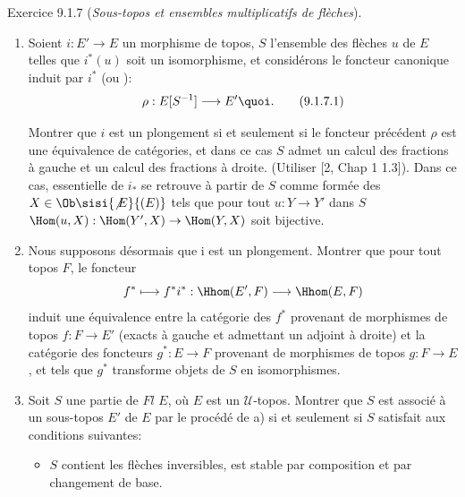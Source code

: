 \documentclass[10pt]{../fichiers-configuration-latex/smfart}
\begin{document}
\begin{enonce*}[remark]{Exercice 9.1.7}
(\emph{Sous-topos et ensembles multiplicatifs de flèches}).

\begin{enumerate}
\renewcommand{\theenumi}{\alph{enumi}}
\renewcommand{\labelenumi}{\theenumi)}
\item Soient $i:E'\rightarrow E$ un morphisme de topos, $S$ l'ensemble des
flèches $u$ de $E$ telles que $i^{\ast}(u)$ soit un isomorphisme, et
considérons le foncteur canonique induit par $i^{\ast}$ (\cf [2,
Chap I] ou ):
\begin{equation*}
\rho:E[S^{-1}]\longrightarrow E'{\quoi}.\tag{9.1.7.1}
\end{equation*}

Montrer que $i$ est un plongement si et seulement si le foncteur
précédent $\rho$ est une équivalence de catégories, et dans ce cas
$S$ admet un calcul des fractions à gauche et un calcul des
fractions à droite. (Utiliser [2, Chap 1 1.3]). Dans ce cas, 
essentielle de $i_{\ast}$ se retrouve à partir de $S$ comme formée
des $X\in \Ob \sisi{\not{E}}{(E)}$ tels que pour tout\pageoriginale
$u:Y\rightarrow Y'$ dans $S$ $\Hom(u,X):\Hom(Y',X)\rightarrow
\Hom(Y,X)$ soit bijective.

\item Nous supposons désormais que i est un plongement. Montrer que
pour tout topos $F$, le foncteur
$$
f^{\ast}\longmapsto f^{\ast}i^{\ast}:\Hhom(E',F)\longrightarrow
\Hhom(E,F)
$$
induit une équivalence entre la catégorie des $f^{\ast}$ provenant
de morphismes de topos $f:F\rightarrow E'$ (\ie exacts à gauche et
admettant un adjoint à droite) et la catégorie des foncteurs
$g^{\ast}:E\rightarrow F$ provenant de morphismes de topos
$g:F\rightarrow E$, et tels que $g^{\ast}$ transforme objets de $S$
en isomorphismes.

\item Soit $S$ une partie de $Fl$ $E$, où $E$ est un
$𝒰$-topos. Montrer que $S$ est associé à un sous-topos $E'$
de $E$ par le procédé de a) si et seulement si $S$ satisfait aux
conditions suivantes:
\begin{itemize}
\item[ST 1)] $S$ contient les flèches inversibles, est stable par
composition et par changement de base.


\end{itemize}
\end{enumerate}
\end{enonce*}
\end{document}
